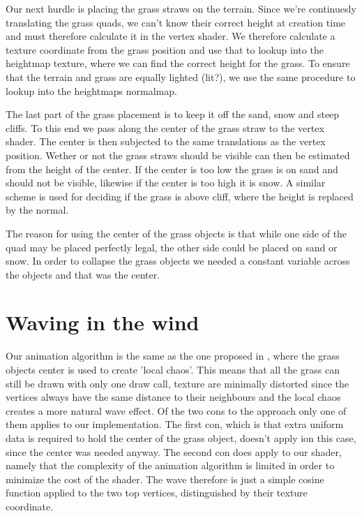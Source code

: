 
Our next hurdle is placing the grass straws on the terrain. Since
we're continuesly translating the grass quads, we can't know their
correct height at creation time and must therefore calculate it in the
vertex shader. We therefore calculate a texture coordinate from the
grass position and use that to lookup into the heightmap texture,
where we can find the correct height for the grass. To ensure that the
terrain and grass are equally lighted (lit?), we use the same
procedure to lookup into the heightmaps normalmap.


The last part of the grass placement is to keep it off the sand, snow
and steep cliffs. To this end we pass along the center of the grass
straw to the vertex shader. The center is then subjected to the same
translations as the vertex position. Wether or not the grass straws
should be visible can then be estimated from the height of the
center. If the center is too low the grass is on sand and should not
be visible, likewise if the center is too high it is snow. A similar
scheme is used for deciding if the grass is above cliff, where the
height is replaced by the normal.

The reason for using the center of the grass objects is that while one
side of the quad may be placed perfectly legal, the other side could
be placed on sand or snow. In order to collapse the grass objects we
needed a constant variable across the objects and that was the center.


\section{Waving in the wind}

Our animation algorithm is the same as the one proposed in
, where the grass objects center is
used to create 'local chaos'. This means that all the grass can still
be drawn with only one draw call, texture are minimally distorted
since the vertices always have the same distance to their neighbours
and the local chaos creates a more natural wave effect. Of the two
cons to the approach only one of them applies to our
implementation. The first con, which is that extra uniform data is
required to hold the center of the grass object, doesn't apply ion
this case, since the center was needed anyway. The second con does
apply to our shader, namely that the complexity of the animation
algorithm is limited in order to minimize the cost of the shader. The
wave therefore is just a simple cosine function applied to the two top
vertices, distinguished by their texture coordinate.


